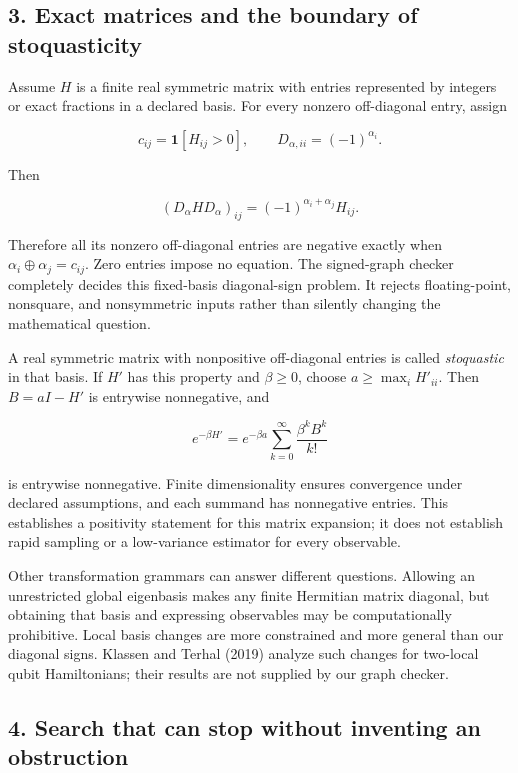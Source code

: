 \documentclass[
  11pt,
]{article}
\begin{document}
\subsection{3. Exact matrices and the boundary of
stoquasticity}\label{exact-matrices-and-the-boundary-of-stoquasticity}

Assume \(H\) is a finite real symmetric matrix with entries represented
by integers or exact fractions in a declared basis. For every nonzero
off-diagonal entry, assign

\[
c_{ij}=\mathbf{1}[H_{ij}>0],\qquad
D_{\alpha,ii}=(-1)^{\alpha_i}.
\]

Then

\[
(D_\alpha H D_\alpha)_{ij}
=(-1)^{\alpha_i+\alpha_j}H_{ij}.
\]

Therefore all its nonzero off-diagonal entries are negative exactly when
\(\alpha_i\oplus\alpha_j=c_{ij}\). Zero entries impose no equation. The
signed-graph checker completely decides this fixed-basis diagonal-sign
problem. It rejects floating-point, nonsquare, and nonsymmetric inputs
rather than silently changing the mathematical question.

A real symmetric matrix with nonpositive off-diagonal entries is called
\emph{stoquastic} in that basis. If \(H'\) has this property and
\(\beta\geq0\), choose \(a\geq\max_i H'_{ii}\). Then \(B=aI-H'\) is
entrywise nonnegative, and

\[
e^{-\beta H'}=e^{-\beta a}\sum_{k=0}^{\infty}
\frac{\beta^kB^k}{k!}
\]

is entrywise nonnegative. Finite dimensionality ensures convergence
under declared assumptions, and each summand has nonnegative entries.
This establishes a positivity statement for this matrix expansion; it
does not establish rapid sampling or a low-variance estimator for every
observable.

Other transformation grammars can answer different questions. Allowing
an unrestricted global eigenbasis makes any finite Hermitian matrix
diagonal, but obtaining that basis and expressing observables may be
computationally prohibitive. Local basis changes are more constrained
and more general than our diagonal signs. Klassen and Terhal (2019)
analyze such changes for two-local qubit Hamiltonians; their results are
not supplied by our graph checker.

\subsection{4. Search that can stop without inventing an
obstruction}\label{search-that-can-stop-without-inventing-an-obstruction}
\end{document}
